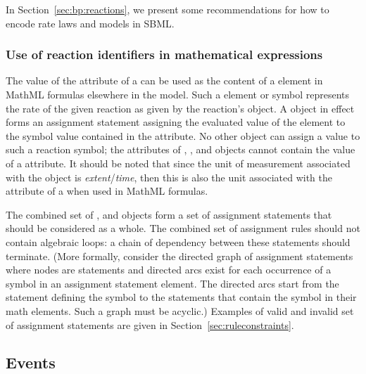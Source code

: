 In Section~\ref{sec:bp:reactions}, we present some recommendations for
how to encode rate laws and models in SBML.


\subsubsection{Use of reaction identifiers in mathematical expressions}
\label{subsec:reaction-as-symbol}

The value of the  attribute of a \Reaction can be
used as the content of a  element in MathML formulas
elsewhere in the model. Such a  element or symbol
represents the rate of the given reaction as given by the
reaction's \KineticLaw object. 
A \KineticLaw object in effect forms an assignment statement
assigning the evaluated value of the  element to the
symbol value contained in the \Reaction {} attribute.  No
other object can assign a value to such a reaction symbol; \ie
the  attributes of \InitialAssignment, \RateRule,
\AssignmentRule and \EventAssignment objects cannot contain the
value of a \Reaction {} attribute.  It should be noted
that since the unit of measurement associated with the \KineticLaw
object is \emph{extent}/\emph{time}, then this is also the unit
associated with the  attribute of a \Reaction when used
in MathML formulas. 

The combined set of \InitialAssignment, \AssignmentRule and
\KineticLaw objects form a set of assignment statements that
should be considered as a whole.  The combined set of assignment
rules should not contain algebraic loops: a chain of dependency
between these statements should terminate.  (More formally,
consider the directed graph of assignment statements where nodes
are statements and directed arcs exist for each occurrence of a
symbol in an assignment statement  element. The directed
arcs start from the statement defining the symbol to the
statements that contain the symbol in their math elements. Such a
graph must be acyclic.)  Examples of valid and invalid set of
assignment statements are given in
Section~\ref{sec:ruleconstraints}.


\subsection{Events}
\label{sec:events}

